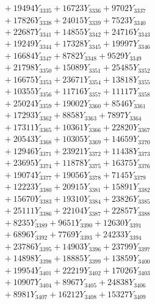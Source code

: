 \documentclass[a4paper,10pt]{article}
\begin{document}
{\begin{align}
&\;  + 19494 Y_{3335} + 16723 Y_{3336} + 9702 Y_{3337} \\[0.3ex]
&\;  + 17826 Y_{3338} + 24015 Y_{3339} + 7523 Y_{3340} \\[0.3ex]
&\;  + 22687 Y_{3341} + 14855 Y_{3342} + 24716 Y_{3343} \\[0.3ex]
&\;  + 19249 Y_{3344} + 17328 Y_{3345} + 19997 Y_{3346} \\[0.3ex]
&\;  + 16684 Y_{3347} + 8782 Y_{3348} + 9529 Y_{3349} \\[0.3ex]
&\;  + 21798 Y_{3350} + 15089 Y_{3351} + 25485 Y_{3352} \\[0.3ex]
&\;  + 16675 Y_{3353} + 23671 Y_{3354} + 13818 Y_{3355} \\[0.3ex]
&\;  + 10355 Y_{3356} + 11716 Y_{3357} + 11117 Y_{3358} \\[0.5ex]\allowbreak
&\;  + 25024 Y_{3359} + 19002 Y_{3360} + 8546 Y_{3361} \\[0.3ex]
&\;  + 17293 Y_{3362} + 8858 Y_{3363} + 7897 Y_{3364} \\[0.3ex]
&\;  + 17311 Y_{3365} + 10361 Y_{3366} + 22820 Y_{3367} \\[0.3ex]
&\;  + 20543 Y_{3368} + 10305 Y_{3369} + 14659 Y_{3370} \\[0.3ex]
&\;  + 12946 Y_{3371} + 23921 Y_{3372} + 11438 Y_{3373} \\[0.3ex]
&\;  + 23695 Y_{3374} + 11878 Y_{3375} + 16375 Y_{3376} \\[0.3ex]
&\;  + 19074 Y_{3377} + 19056 Y_{3378} + 7145 Y_{3379} \\[0.3ex]
&\;  + 12223 Y_{3380} + 20915 Y_{3381} + 15891 Y_{3382} \\[0.3ex]
&\;  + 15670 Y_{3383} + 19310 Y_{3384} + 23826 Y_{3385} \\[0.3ex]
&\;  + 25111 Y_{3386} + 22104 Y_{3387} + 22857 Y_{3388} \\[0.5ex]\allowbreak
&\;  + 8235 Y_{3389} + 9651 Y_{3390} + 12630 Y_{3391} \\[0.3ex]
&\;  + 6896 Y_{3392} + 7769 Y_{3393} + 24233 Y_{3394} \\[0.3ex]
&\;  + 23786 Y_{3395} + 14903 Y_{3396} + 23799 Y_{3397} \\[0.3ex]
&\;  + 14898 Y_{3398} + 18885 Y_{3399} + 13859 Y_{3400} \\[0.3ex]
&\;  + 19954 Y_{3401} + 22219 Y_{3402} + 17026 Y_{3403} \\[0.3ex]
&\;  + 10907 Y_{3404} + 8967 Y_{3405} + 24838 Y_{3406} \\[0.3ex]
&\;  + 8981 Y_{3407} + 16212 Y_{3408} + 15327 Y_{3409} \\[0.3ex]

\end{align}}
\end{document}
